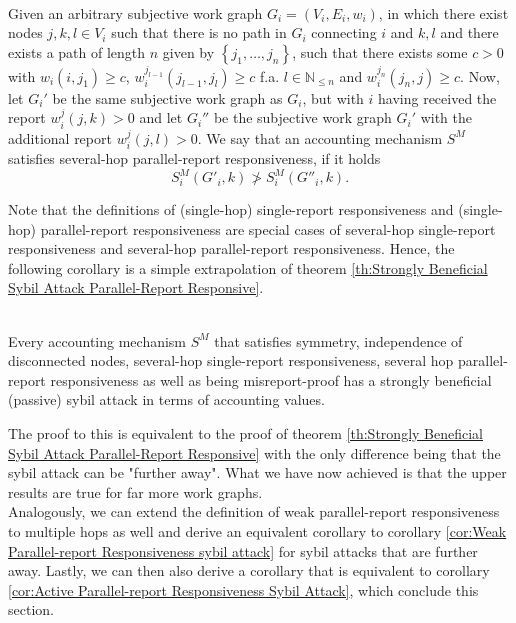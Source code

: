 \begin{definition}\ \\
\label{def:Several-Hop Parallel-report Responsiveness}
Given an arbitrary subjective work graph $G_i=(V_i,E_i,w_i)$, in which there exist nodes $j,k,l\in{}V_i$ such that there is no path in $G_i$ connecting $i$ and $k,l$ and there exists a path of length $n$ given by $\left\lbrace{}j_1,\ldots,j_n\right\rbrace$, such that there exists some $c>0$ with $w_i(i,j_1)\geq{}c$, $w_i^{j_{l-1}}(j_{l-1},j_l)\geq{}c$ f.a. $l\in\mathbb{N}_{\leq{}n}$ and $w_i^{j_n}(j_n,j)\geq{}c$. Now, let $G_i'$ be the same subjective work graph as $G_i$, but with $i$ having received the report $w_i^j(j,k)>0$ and let $G_i''$ be the subjective work graph $G_i'$ with the additional report $w_i^j(j,l)>0$. We say that an accounting mechanism $S^M$ satisfies several-hop parallel-report responsiveness, if it holds
\[
S^M_i(G'_i,k)\not > S^M_i(G''_i,k).
\]
\end{definition}

\noindent{}Note that the definitions of (single-hop) single-report responsiveness and (single-hop) parallel-report responsiveness are special cases of several-hop single-report responsiveness and several-hop parallel-report responsiveness. Hence, the following corollary is a simple extrapolation of theorem \ref{th:Strongly Beneficial Sybil Attack Parallel-Report Responsive}.

\begin{corollary}[]\ \\
\label{cor:Strongly Beneficial Sybil Attack Several-hop Parallel-Report Responsive}
Every accounting mechanism $S^M$ that satisfies symmetry, independence of disconnected nodes, several-hop single-report responsiveness, several hop parallel-report responsiveness as well as being misreport-proof has a strongly beneficial (passive) sybil attack in terms of accounting values. 
\end{corollary}

\noindent{}The proof to this is equivalent to the proof of theorem \ref{th:Strongly Beneficial Sybil Attack Parallel-Report Responsive} with the only difference being that the sybil attack can be "further away". What we have now achieved is that the upper results are true for far more work graphs. \vspace{1em}\\

\noindent{}Analogously, we can extend the definition of weak parallel-report responsiveness to multiple hops as well and derive an equivalent corollary to corollary \ref{cor:Weak Parallel-report Responsiveness sybil attack} for sybil attacks that are further away. Lastly, we can then also derive a corollary that is equivalent to corollary \ref{cor:Active Parallel-report Responsiveness Sybil Attack}, which conclude this section.

